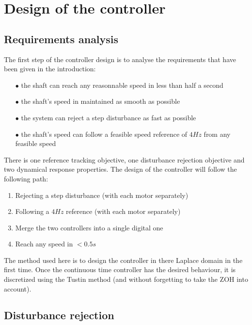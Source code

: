 \setcounter{secnumdepth}{1}

\chapter{Design of the controller}

\section{Requirements analysis}

The first step of the controller design is to analyse the requirements that have been given in the introduction:

\begin{enumerate}
    \item[$\bullet$] the shaft can reach any reasonnable speed in less than half a second
    \item[$\bullet$] the shaft's speed in maintained as smooth as possible
    \item[$\bullet$] the system can reject a step disturbance as fast as possible
    \item[$\bullet$] the shaft's speed can follow a feasible speed reference of $4 Hz$ from any feasible speed
\end{enumerate}

There is one reference tracking objective, one disturbance rejection objective and two dynamical response properties.
The design of the controller will follow the following path:

\begin{enumerate}
    \item Rejecting a step disturbance (with each motor separately)
    \item Following a $4 Hz$ reference (with each motor separately)
    \item Merge the two controllers into a single digital one
    \item Reach any speed in $< 0.5 s$
\end{enumerate}

The method used here is to design the controller in there Laplace domain in the first time. Once the continuous time
controller has the desired behaviour, it is discretized using the Tustin method (and without forgetting to take the
ZOH into account).

\section{Disturbance rejection}

